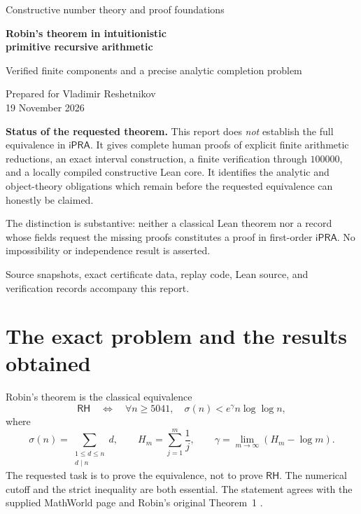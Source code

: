 \documentclass[11pt,a4paper]{article}
\theoremstyle{definition}
\newcommand{\ipra}{\mathsf{iPRA}}
\newcommand{\RH}{\mathsf{RH}}
\begin{document}
\begin{titlepage}
\centering
\vspace*{12mm}
{\Large Constructive number theory and proof foundations\par}
\vspace{14mm}
{\huge\bfseries Robin's theorem in intuitionistic\\[3mm]
primitive recursive arithmetic\par}
\vspace{8mm}
{\Large Verified finite components and a precise analytic completion problem\par}
\vspace{12mm}
{\large Prepared for Vladimir Reshetnikov\\19 November 2026\par}
\vfill
\begin{minipage}{0.92\textwidth}
\textbf{Status of the requested theorem.}
This report does \emph{not} establish the full equivalence in $\ipra$.
It gives complete human proofs of explicit finite arithmetic reductions,
an exact interval construction, a finite verification through $100000$,
and a locally compiled constructive Lean core. It identifies the analytic
and object-theory obligations which remain before the requested equivalence
can honestly be claimed.

The distinction is substantive: neither a classical Lean theorem nor a
record whose fields request the missing proofs constitutes a proof in
first-order $\ipra$. No impossibility or independence result is asserted.
\end{minipage}
\vfill
{\small Source snapshots, exact certificate data, replay code, Lean source,
and verification records accompany this report.}
\end{titlepage}
\tableofcontents
\newpage

\section{The exact problem and the results obtained}

Robin's theorem is the classical equivalence
\begin{equation}\label{eq:target}
 \RH\quad\Longleftrightarrow\quad
 \forall n\ge5041,\quad \sigma(n)<e^\gamma n\log\log n,
\end{equation}
where
\[
 \sigma(n)=\sum_{\substack{1\le d\le n\\d\mid n}}d,\qquad
 H_m=\sum_{j=1}^{m}\frac1j,\qquad
 \gamma=\lim_{m\to\infty}(H_m-\log m).
\]
The requested task is to prove the equivalence, not to prove $\RH$.
The numerical cutoff and the strict inequality are both essential.
The statement agrees with the supplied MathWorld page and Robin's original
Theorem~1 \cite{MathWorld,Robin}.
\end{document}
